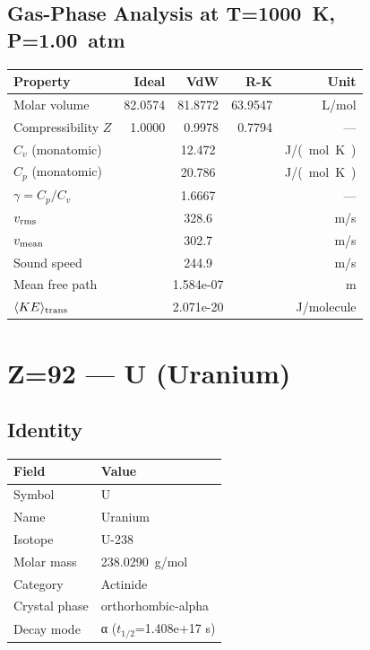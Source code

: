 \documentclass[11pt,a4paper]{article}
\begin{document}
\subsection{Gas-Phase Analysis at T=\SI{1000}{K}, P=\SI{1.00}{atm}}
\begin{tabular}{lrrrr}
  \toprule
  Property & Ideal & VdW & R-K & Unit \\
  \midrule
  Molar volume & 82.0574 & 81.8772 & 63.9547 & \si{L/mol} \\
  Compressibility $Z$ & 1.0000 & 0.9978 & 0.7794 & --- \\
  \midrule
  $C_v$ (monatomic) & \multicolumn{3}{c}{12.472} & \si{J/(mol.K)} \\
  $C_p$ (monatomic) & \multicolumn{3}{c}{20.786} & \si{J/(mol.K)} \\
  $\gamma = C_p/C_v$ & \multicolumn{3}{c}{1.6667} & --- \\
  $v_{\rm rms}$ & \multicolumn{3}{c}{328.6} & \si{m/s} \\
  $v_{\rm mean}$ & \multicolumn{3}{c}{302.7} & \si{m/s} \\
  Sound speed & \multicolumn{3}{c}{244.9} & \si{m/s} \\
  Mean free path & \multicolumn{3}{c}{1.584e-07} & \si{m} \\
  $\langle KE \rangle_{\rm trans}$ & \multicolumn{3}{c}{2.071e-20} & \si{J/molecule} \\
  \bottomrule
\end{tabular}

\newpage

\section{Z=92 --- U (Uranium)}
\label{sec:Z92}

\subsection{Identity}
\begin{tabular}{ll}
  \toprule
  Field & Value \\
  \midrule
  Symbol & U \\
  Name & Uranium \\
  Isotope & U-238 \\
  Molar mass & \SI{238.0290}{g/mol} \\
  Category & Actinide \\
  Crystal phase & orthorhombic-alpha \\
  Decay mode & α ($t_{1/2}$=1.408e+17 s) \\
  \bottomrule
\end{tabular}
\end{document}
